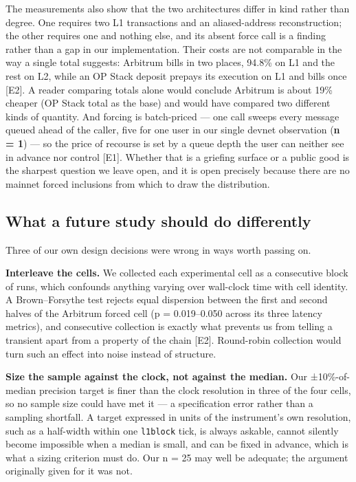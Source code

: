 \documentclass[conference]{IEEEtran}
\renewcommand{\_}{\textunderscore\allowbreak}
\begin{document}
The measurements also show that the two architectures differ in kind
rather than degree. One requires two L1 transactions and an
aliased-address reconstruction; the other requires one and nothing else,
and its absent force call is a finding rather than a gap in our
implementation. Their costs are not comparable in the way a single total
suggests: Arbitrum bills in two places, 94.8\% on L1 and the rest on L2,
while an OP Stack deposit prepays its execution on L1 and bills once
{[}E2{]}. A reader comparing totals alone would conclude Arbitrum is
about 19\% cheaper (OP Stack total as the base) and would have compared
two different kinds of quantity. And forcing is batch-priced --- one
call sweeps every message queued ahead of the caller, five for one user
in our single devnet observation (\textbf{n = 1}) --- so the price of
recourse is set by a queue depth the user can neither see in advance nor
control {[}E1{]}. Whether that is a griefing surface or a public good is
the sharpest question we leave open, and it is open precisely because
there are no mainnet forced inclusions from which to draw the
distribution.

\subsection{What a future study should do
differently}\label{what-a-future-study-should-do-differently}

Three of our own design decisions were wrong in ways worth passing on.

\textbf{Interleave the cells.} We collected each experimental cell as a
consecutive block of runs, which confounds anything varying over
wall-clock time with cell identity. A Brown--Forsythe test rejects equal
dispersion between the first and second halves of the Arbitrum forced
cell (p = 0.019--0.050 across its three latency metrics), and
consecutive collection is exactly what prevents us from telling a
transient apart from a property of the chain {[}E2{]}. Round-robin
collection would turn such an effect into noise instead of structure.

\textbf{Size the sample against the clock, not against the median.} Our
±10\%-of-median precision target is finer than the clock resolution in
three of the four cells, so no sample size could have met it --- a
specification error rather than a sampling shortfall. A target expressed
in units of the instrument's own resolution, such as a half-width within
one \texttt{l1\_block} tick, is always askable, cannot silently become
impossible when a median is small, and can be fixed in advance, which is
what a sizing criterion must do. Our n = 25 may well be adequate; the
argument originally given for it was not.
\end{document}
